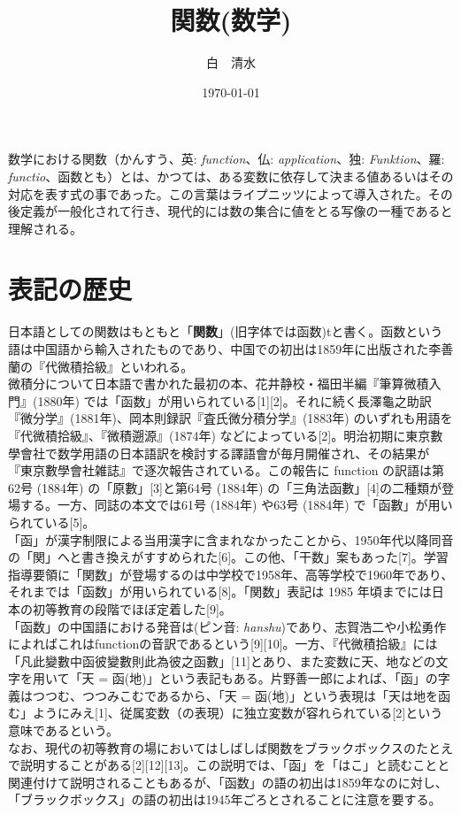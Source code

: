 \documentclass[a4j,12pt]{jreport}
\title{関数(数学)}
\author{白　清水}
\date{\today}
\begin{document}
\maketitle
数学における関数（かんすう、英: {\it function}、仏: {\it application}、独: {\it Funktion}、羅: {\it functio}、函数とも）とは、かつては、ある変数に依存して決まる値あるいはその対応を表す式の事であった。この言葉はライプニッツによって導入された。その後定義が一般化されて行き、現代的には数の集合に値をとる写像の一種であると理解される。
\chapter{表記の歴史}
日本語としての関数はもともと「{\bf 関数}」(旧字体では函数)tと書く。函数という語は中国語から輸入されたものであり、中国での初出は1859年に出版された李善蘭の『代微積拾級』といわれる。\\
微積分について日本語で書かれた最初の本、花井静校・福田半編『筆算微積入門』(1880年) では「函数」が用いられている[1][2]。それに続く長澤龜之助訳『微分学』(1881年)、岡本則録訳『査氏微分積分学』(1883年) のいずれも用語を『代微積拾級』、『微積遡源』(1874年) などによっている[2]。明治初期に東京數學會社で数学用語の日本語訳を検討する譯語會が毎月開催され、その結果が『東京數學會社雑誌』で逐次報告されている。この報告に function の訳語は第62号 (1884年) の「原數」[3]と第64号 (1884年) の「三角法函數」[4]の二種類が登場する。一方、同誌の本文では61号 (1884年) や63号 (1884年) で「函數」が用いられている[5]。\\
「函」が漢字制限による当用漢字に含まれなかったことから、1950年代以降同音の「関」へと書き換えがすすめられた[6]。この他、「干数」案もあった[7]。学習指導要領に「関数」が登場するのは中学校で1958年、高等学校で1960年であり、それまでは「函数」が用いられている[8]。「関数」表記は 1985 年頃までには日本の初等教育の段階でほぼ定着した[9]。\\
「函数」の中国語における発音は(ピン音: {\it hanshu})であり、志賀浩二や小松勇作によればこれはfunctionの音訳であるという[9][10]。一方、『代微積拾級』には「凡此變數中函彼變數則此為彼之函數」[11]とあり、また変数に天、地などの文字を用いて「天 = 函(地)」という表記もある。片野善一郎によれば、「函」の字義はつつむ、つつみこむであるから、「天 = 函(地)」という表現は「天は地を函む」ようにみえ[1]、従属変数（の表現）に独立変数が容れられている[2]という意味であるという。\\
なお、現代の初等教育の場においてはしばしば関数をブラックボックスのたとえで説明することがある[2][12][13]。この説明では、「函」を「はこ」と読むことと関連付けて説明されることもあるが、「函数」の語の初出は1859年なのに対し、「ブラックボックス」の語の初出は1945年ごろとされることに注意を要する。\\
\end{document}
